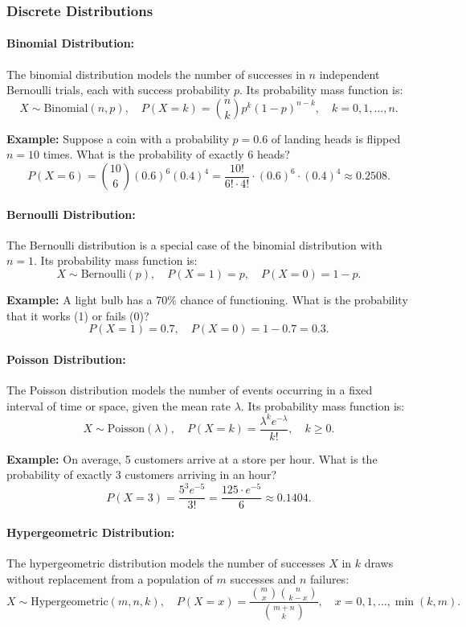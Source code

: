\documentclass[12pt,a4paper]{article}
\begin{document}
\subsubsection{Discrete Distributions}

\paragraph{Binomial Distribution:}
The binomial distribution models the number of successes in \(n\) independent Bernoulli trials, each with success probability \(p\). Its probability mass function is:
\[
X \sim \text{Binomial}(n, p), \quad P(X = k) = \binom{n}{k} p^k (1-p)^{n-k}, \quad k = 0, 1, \dots, n.
\]

\textbf{Example:} Suppose a coin with a probability \(p = 0.6\) of landing heads is flipped \(n = 10\) times. What is the probability of exactly 6 heads?
\[
P(X = 6) = \binom{10}{6} (0.6)^6 (0.4)^4 = \frac{10!}{6! \cdot 4!} \cdot (0.6)^6 \cdot (0.4)^4 \approx 0.2508.
\]

\paragraph{Bernoulli Distribution:}
The Bernoulli distribution is a special case of the binomial distribution with \(n=1\). Its probability mass function is:
\[
X \sim \text{Bernoulli}(p), \quad P(X=1) = p, \quad P(X=0) = 1-p.
\]

\textbf{Example:} A light bulb has a 70\% chance of functioning. What is the probability that it works (1) or fails (0)?
\[
P(X=1) = 0.7, \quad P(X=0) = 1 - 0.7 = 0.3.
\]

\paragraph{Poisson Distribution:}
The Poisson distribution models the number of events occurring in a fixed interval of time or space, given the mean rate \(\lambda\). Its probability mass function is:
\[
X \sim \text{Poisson}(\lambda), \quad P(X = k) = \frac{\lambda^k e^{-\lambda}}{k!}, \quad k \geq 0.
\]

\textbf{Example:} On average, 5 customers arrive at a store per hour. What is the probability of exactly 3 customers arriving in an hour?
\[
P(X = 3) = \frac{5^3 e^{-5}}{3!} = \frac{125 \cdot e^{-5}}{6} \approx 0.1404.
\]

\paragraph{Hypergeometric Distribution:}
The hypergeometric distribution models the number of successes \(X\) in \(k\) draws without replacement from a population of \(m\) successes and \(n\) failures:
\[
X \sim \text{Hypergeometric}(m, n, k), \quad P(X = x) = \frac{\binom{m}{x} \binom{n}{k-x}}{\binom{m+n}{k}}, \quad x = 0, 1, \dots, \min(k, m).
\]
\end{document}
